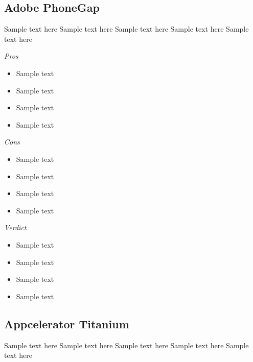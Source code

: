 \documentclass[11pt]{article}
\begin{document}
\subsection{Adobe PhoneGap}

Sample text here
Sample text here
Sample text here
Sample text here
Sample text here \par

\emph{Pros}
\begin{itemize}
  \setlength{\itemsep}{0mm}  
  \item Sample text
  \item Sample text
  \item Sample text
  \item Sample text
\end{itemize}
\par
\emph{Cons}
\begin{itemize}
  \setlength{\itemsep}{0mm}  
  \item Sample text
  \item Sample text
  \item Sample text
  \item Sample text
\end{itemize}
\par
\emph{Verdict}
\begin{itemize}
  \setlength{\itemsep}{0mm}  
  \item Sample text
  \item Sample text
  \item Sample text
  \item Sample text
\end{itemize}


\subsection{Appcelerator Titanium}

Sample text here
Sample text here
Sample text here
Sample text here
Sample text here \par
\end{document}

